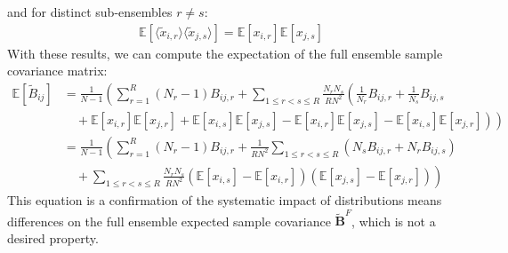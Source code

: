 \documentclass[12pt]{scrartcl}
\begin{document}
and for distinct sub-ensembles $r \ne s$:
\begin{align}
\mathbb{E} \left[\langle \widetilde{x}_{i,r} \rangle \langle \widetilde{x}_{j,s} \rangle\right] = \mathbb{E} \left[x_{i,r}\right] \mathbb{E} \left[x_{j,s}\right]
\end{align}
With these results, we can compute the expectation of the full ensemble sample covariance matrix:
\begin{align}
\mathbb{E} \left[\widetilde{B}_{ij}\right] & = \frac{1}{N-1} \left(\sum_{r=1}^R \left(N_r-1\right) B_{ij,r} + \sum_{1 \le r < s \le R} \frac{N_r N_s}{R N^2} \left(\frac{1}{N_r} B_{ij,r} + \frac{1}{N_s} B_{ij,s} \right. \right.\nonumber \\
& \left. \left. \quad + \mathbb{E} \left[x_{i,r} \right] \mathbb{E} \left[x_{j,r} \right] + \mathbb{E} \left[x_{i,s} \right] \mathbb{E} \left[x_{j,s} \right] - \mathbb{E} \left[x_{i,r}\right] \mathbb{E} \left[x_{j,s}\right] - \mathbb{E} \left[x_{i,s}\right] \mathbb{E} \left[x_{j,r}\right] \right) \right) \nonumber \\
& = \frac{1}{N-1} \left(\sum_{r=1}^R \left(N_r-1\right) B_{ij,r} + \frac{1}{R N^2} \sum_{1 \le r < s \le R} \left(N_s B_{ij,r} + N_r B_{ij,s}\right) \right. \nonumber \\
& \left. \quad + \sum_{1 \le r < s \le R} \frac{N_r N_s}{R N^2} \left(\mathbb{E} \left[x_{i,s} \right] - \mathbb{E} \left[x_{i,r} \right]\right)\left(\mathbb{E} \left[x_{j,s} \right] - \mathbb{E} \left[x_{j,r} \right] \right)\right)
\end{align}
This equation is a confirmation of the systematic impact of distributions means differences on the full ensemble expected sample covariance $\widetilde{\mathbf{B}}^F$, which is not a desired property.
\end{document}
